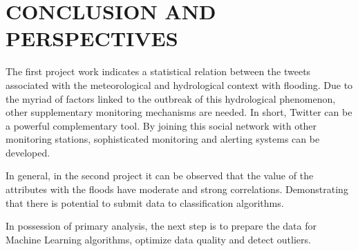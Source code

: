 \chapter{CONCLUSION AND PERSPECTIVES} \label{Cron}

The first project work indicates a statistical relation between the tweets associated with the meteorological and hydrological context with flooding. Due to the myriad of factors linked to the outbreak of this hydrological phenomenon, other supplementary monitoring mechanisms are needed. In short, Twitter can be a powerful complementary tool. By joining this social network with other monitoring stations, sophisticated monitoring and alerting systems can be developed.

In general, in the second project it can be observed that the value of the attributes with the floods have moderate and strong correlations. Demonstrating that there is potential to submit data to classification algorithms.

In possession of primary analysis, the next step is to prepare the data for Machine Learning algorithms, optimize data quality and detect outliers. 


